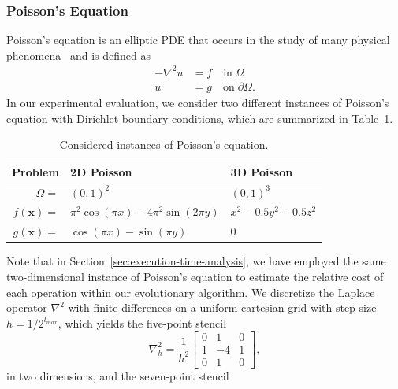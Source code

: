 \subsubsection{Poisson's Equation}
\label{sec:poisson-equation}
Poisson's equation is an elliptic PDE that occurs in the study of many physical phenomena~\cite{folland2020introduction} and is defined as
\begin{equation}
	\begin{split}
		-\nabla^{2} u & = f \quad \text{in} \; \Omega \\
		u & = g \quad \text{on} \; \partial \Omega.
	\end{split}
	\label{eq:poisson}
\end{equation}
In our experimental evaluation, we consider two different instances of Poisson's equation with Dirichlet boundary conditions, which are summarized in Table~\ref{table:poisson-problems}.
\begin{table}
	\caption{Considered instances of Poisson's equation.}
	\begin{tabular}{r l l}
		\toprule
		Problem & 2D Poisson & 3D Poisson \\
		\midrule
		$\Omega = $ & $ (0, 1)^2$ & $(0, 1)^3$ \\
		\midrule
		$f(\bm{x}) = $ & $\pi^2 \cos(\pi x) - 4 \pi^2 \sin(2 \pi y)$ & $x^2 - 0.5 y^2 - 0.5 z^2$ \\
		\midrule
		$g(\bm{x}) = $ & $\cos(\pi x) - \sin(\pi y)$ & $0$ \\
		\bottomrule
	\end{tabular}
	\label{table:poisson-problems}
\end{table}
Note that in Section~\ref{sec:execution-time-analysis}, we have employed the same two-dimensional instance of Poisson's equation to estimate the relative cost of each operation within our evolutionary algorithm.
We discretize the Laplace operator $\nabla^{2}$ with finite differences on a uniform cartesian grid with step size $h = 1/2^{l_{max}}$, which yields the five-point stencil
\begin{equation*}
	\nabla^2_h = 
	\frac{1}{h^2} \begin{bmatrix}
		0 & 1 & 0\\
		1 & -4 & 1 \\
		0 & 1 & 0  
	\end{bmatrix},
\end{equation*}
in two dimensions, and the seven-point stencil
